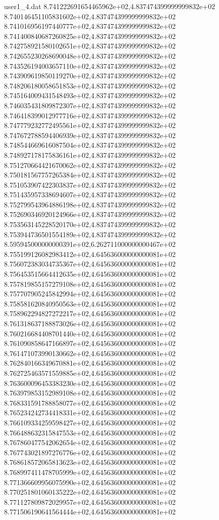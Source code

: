 \begin{filecontents}{user1_4.dat}
8.741222691654465962e+02,4.837474399999999832e+02
8.740146451105831602e+02,4.837474399999999832e+02
8.741016956197440777e+02,4.837474399999999832e+02
8.741400840687260825e+02,4.837474399999999832e+02
8.742758921580102651e+02,4.837474399999999832e+02
8.742655230268690048e+02,4.837474399999999832e+02
8.743526194003657110e+02,4.837474399999999832e+02
8.743909619850119270e+02,4.837474399999999832e+02
8.748206180058651853e+02,4.837474399999999832e+02
8.745164009431548493e+02,4.837474399999999832e+02
8.746035431809872307e+02,4.837474399999999832e+02
8.746418399012977716e+02,4.837474399999999832e+02
8.747779232772495561e+02,4.837474399999999832e+02
8.747672788594406939e+02,4.837474399999999832e+02
8.748544669616087504e+02,4.837474399999999832e+02
8.748927178175836161e+02,4.837474399999999832e+02
8.751270664421670062e+02,4.837474399999999832e+02
8.750181567757265384e+02,4.837474399999999832e+02
8.751053907422303837e+02,4.837474399999999832e+02
8.751435957338694607e+02,4.837474399999999832e+02
8.752799543964886198e+02,4.837474399999999832e+02
8.752690346920124966e+02,4.837474399999999832e+02
8.753563145228520170e+02,4.837474399999999832e+02
8.753944736501554189e+02,4.837474399999999832e+02
8.595945000000000391e+02,6.262711000000000467e+02
8.755199126082983412e+02,4.645636000000000081e+02
8.756072383034735367e+02,4.645636000000000081e+02
8.756453515664412635e+02,4.645636000000000081e+02
8.757819855157279108e+02,4.645636000000000081e+02
8.757707905245842994e+02,4.645636000000000081e+02
8.758581620840950563e+02,4.645636000000000081e+02
8.758962294827272217e+02,4.645636000000000081e+02
8.761318637188873026e+02,4.645636000000000081e+02
8.760216684408701440e+02,4.645636000000000081e+02
8.761090858647166897e+02,4.645636000000000081e+02
8.761471073990130662e+02,4.645636000000000081e+02
8.762840166349670881e+02,4.645636000000000081e+02
8.762725463571559885e+02,4.645636000000000081e+02
8.763600096453383230e+02,4.645636000000000081e+02
8.763979853152989108e+02,4.645636000000000081e+02
8.768331591788858077e+02,4.645636000000000081e+02
8.765234242734418331e+02,4.645636000000000081e+02
8.766109334259598427e+02,4.645636000000000081e+02
8.766488632315847553e+02,4.645636000000000081e+02
8.767860477542062654e+02,4.645636000000000081e+02
8.767743021897276776e+02,4.645636000000000081e+02
8.768618572065813623e+02,4.645636000000000081e+02
8.768997411478705999e+02,4.645636000000000081e+02
8.771366609956075990e+02,4.645636000000000081e+02
8.770251801060135222e+02,4.645636000000000081e+02
8.771127809872029957e+02,4.645636000000000081e+02
8.771506190641564444e+02,4.645636000000000081e+02

\end{filecontents}
